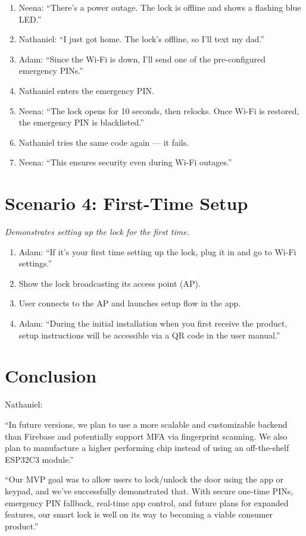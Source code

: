 \documentclass[12pt]{article}
\begin{document}
\begin{enumerate}
    \item Neena: “There’s a power outage. The lock is offline and shows a flashing blue LED.”
    \item Nathaniel: “I just got home. The lock’s offline, so I’ll text my dad.”
    \item Adam: “Since the Wi-Fi is down, I’ll send one of the pre-configured emergency PINs.”
    \item Nathaniel enters the emergency PIN.
    \item Neena: “The lock opens for 10 seconds, then relocks. Once Wi-Fi is restored, the emergency PIN is blacklisted.”
    \item Nathaniel tries the same code again — it fails.
    \item Neena: “This ensures security even during Wi-Fi outages.”
\end{enumerate}

\section{Scenario 4: First-Time Setup}
\textit{Demonstrates setting up the lock for the first time.}

\begin{enumerate}
    \item Adam: “If it’s your first time setting up the lock, plug it in and go to Wi-Fi settings.”
    \item Show the lock broadcasting its access point (AP).
    \item User connects to the AP and launches setup flow in the app.
    \item Adam: “During the initial installation when you first receive the product, setup instructions will be accessible via a QR code in the user manual.”
\end{enumerate}

\section{Conclusion}
Nathaniel:

“In future versions, we plan to use a more scalable and customizable backend than Firebase and potentially support MFA via fingerprint scanning. We also plan to manufacture a higher performing chip instead of using an off-the-shelf ESP32C3 module.”

“Our MVP goal was to allow users to lock/unlock the door using the app or keypad, and we’ve successfully demonstrated that. With secure one-time PINs, emergency PIN fallback, real-time app control, and future plans for expanded features, our smart lock is well on its way to becoming a viable consumer product.”
\end{document}
